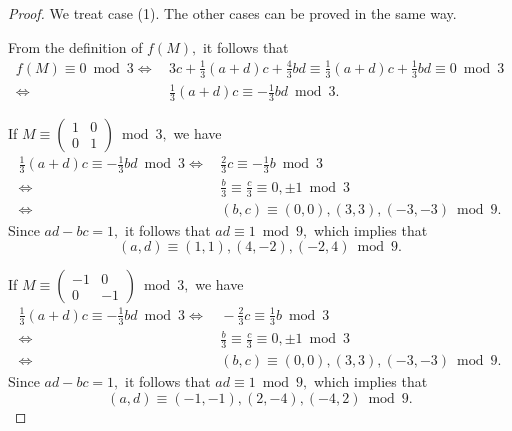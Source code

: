 \documentclass[12pt]{article}
\theoremstyle{definition}
\numberwithin{equation}{section}
\numberwithin{theorem}{section}
\begin{document}
\begin{proof}
We treat case (1). The other cases can be proved in the same way. 
\par
From the definition of $f(M),$ 
it follows that 
\begin{align*}
f(M) \equiv 0 \bmod{3} 
\Longleftrightarrow &\,
3c+\frac13(a+d)c+\frac43bd 
\equiv
\frac13(a+d)c+\frac13bd
\equiv 0 \bmod{3}  \\
\Longleftrightarrow &\,
\frac13(a+d)c\equiv -\frac13bd  \bmod{3}.
\end{align*}
\par
If 
$M\equiv 
\begin{pmatrix}
1 & 0 \\
0 & 1
\end{pmatrix} 
\bmod{3},$ 
we have 
\begin{align*}
\frac13(a+d)c\equiv -\frac13bd  \bmod{3} 
\Longleftrightarrow &\,
\frac23 c\equiv -\frac13 b \bmod{3} \\
\Longleftrightarrow &\,
\frac{b}{3} \equiv \frac{c}{3} \equiv 0, \pm1 \bmod{3} \\
\Longleftrightarrow &\,
(b,c)\equiv (0,0), (3,3), (-3,-3) \bmod{9}.
\end{align*}
Since $ad-bc=1,$ it follows that $ad\equiv 1 \bmod{9},$ 
which implies that 
\begin{equation*}
(a,d)\equiv (1,1), (4,-2), (-2,4) \bmod{9}.
\end{equation*}
\par
If 
$M\equiv 
\begin{pmatrix}
-1 & 0 \\
0 & -1
\end{pmatrix} 
\bmod{3},$ 
we have 
\begin{align*}
\frac13(a+d)c\equiv -\frac13bd  \bmod{3} 
\Longleftrightarrow &\,
-\frac23 c\equiv \frac13 b \bmod{3} \\
\Longleftrightarrow &\,
\frac{b}{3} \equiv \frac{c}{3} \equiv 0, \pm1 \bmod{3} \\
\Longleftrightarrow &\,
(b,c)\equiv (0,0), (3,3), (-3,-3) \bmod{9}.
\end{align*}
Since $ad-bc=1,$ it follows that $ad\equiv 1 \bmod{9},$ 
which implies that 
\begin{equation*}
(a,d)\equiv (-1,-1), (2,-4), (-4,2) \bmod{9}.
\end{equation*}
\end{proof}
\end{document}
